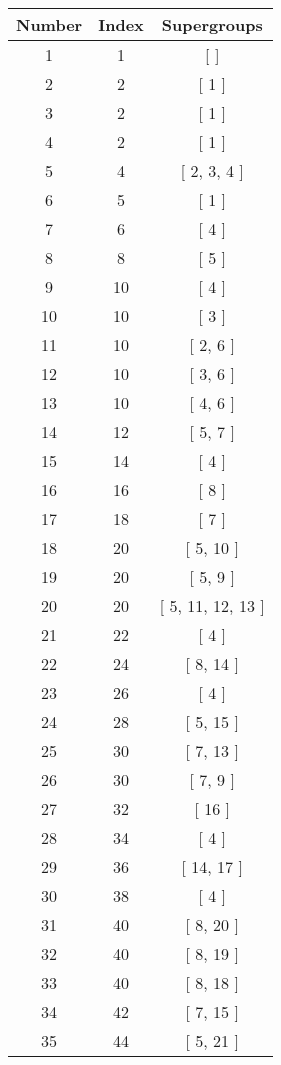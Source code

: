 \begin{center}
\begin{longtable}[H]{|| c c c ||}
\hline
Number & Index & Supergroups \\ 
\hline
1 & 1 & [  ] \\ 
\hline
2 & 2 & [ 1 ] \\ 
\hline
3 & 2 & [ 1 ] \\ 
\hline
4 & 2 & [ 1 ] \\ 
\hline
5 & 4 & [ 2, 3, 4 ] \\ 
\hline
6 & 5 & [ 1 ] \\ 
\hline
7 & 6 & [ 4 ] \\ 
\hline
8 & 8 & [ 5 ] \\ 
\hline
9 & 10 & [ 4 ] \\ 
\hline
10 & 10 & [ 3 ] \\ 
\hline
11 & 10 & [ 2, 6 ] \\ 
\hline
12 & 10 & [ 3, 6 ] \\ 
\hline
13 & 10 & [ 4, 6 ] \\ 
\hline
14 & 12 & [ 5, 7 ] \\ 
\hline
15 & 14 & [ 4 ] \\ 
\hline
16 & 16 & [ 8 ] \\ 
\hline
17 & 18 & [ 7 ] \\ 
\hline
18 & 20 & [ 5, 10 ] \\ 
\hline
19 & 20 & [ 5, 9 ] \\ 
\hline
20 & 20 & [ 5, 11, 12, 13 ] \\ 
\hline
21 & 22 & [ 4 ] \\ 
\hline
22 & 24 & [ 8, 14 ] \\ 
\hline
23 & 26 & [ 4 ] \\ 
\hline
24 & 28 & [ 5, 15 ] \\ 
\hline
25 & 30 & [ 7, 13 ] \\ 
\hline
26 & 30 & [ 7, 9 ] \\ 
\hline
27 & 32 & [ 16 ] \\ 
\hline
28 & 34 & [ 4 ] \\ 
\hline
29 & 36 & [ 14, 17 ] \\ 
\hline
30 & 38 & [ 4 ] \\ 
\hline
31 & 40 & [ 8, 20 ] \\ 
\hline
32 & 40 & [ 8, 19 ] \\ 
\hline
33 & 40 & [ 8, 18 ] \\ 
\hline
34 & 42 & [ 7, 15 ] \\ 
\hline
35 & 44 & [ 5, 21 ] \\ 

\end{longtable}
\end{center}
